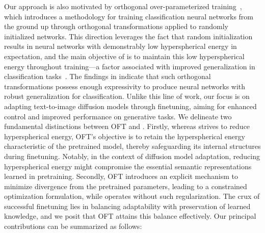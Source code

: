 Our approach is also motivated by orthogonal over-parameterized training~\cite{liu2021orthogonal}, which introduces a methodology for training classification neural networks from the ground up through orthogonal transformations applied to randomly initialized networks. This direction leverages the fact that random initialization results in neural networks with demonstrably low hyperspherical energy in expectation, and the main objective of \cite{liu2021orthogonal} is to maintain this low hyperspherical energy throughout training—a factor associated with improved generalization in classification tasks~\cite{liu2018learning,lin2020regularizing}. The findings in \cite{liu2021orthogonal} indicate that such orthogonal transformations possess enough expressivity to produce neural networks with robust generalization for classification. Unlike this line of work, our focus is on adapting text-to-image diffusion models through finetuning, aiming for enhanced control and improved performance on generative tasks. We delineate two fundamental distinctions between OFT and \cite{liu2021orthogonal}. Firstly, whereas \cite{liu2021orthogonal} strives to reduce hyperspherical energy, OFT’s objective is to retain the hyperspherical energy characteristic of the pretrained model, thereby safeguarding its internal structures during finetuning. Notably, in the context of diffusion model adaptation, reducing hyperspherical energy might compromise the essential semantic representations learned in pretraining. Secondly, OFT introduces an explicit mechanism to minimize divergence from the pretrained parameters, leading to a constrained optimization formulation, while \cite{liu2021orthogonal} operates without such regularization. The crux of successful finetuning lies in balancing adaptability with preservation of learned knowledge, and we posit that OFT attains this balance effectively. Our principal contributions can be summarized as follows:

